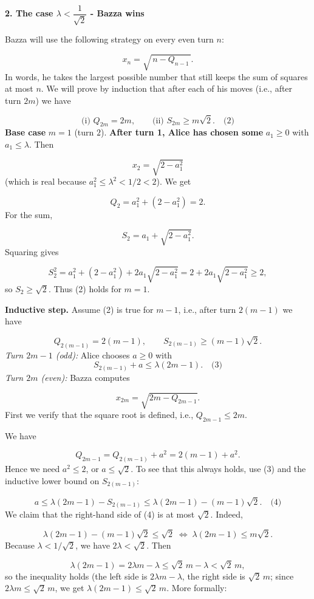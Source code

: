 \documentclass{llmxive}
\providecommand{\solutionheading}[1]{\par\smallskip\noindent\textbf{#1}\par}
\begin{document}
\solutionheading{2. The case \(\lambda < \dfrac{1}{\sqrt{2}}\) - Bazza wins}
Bazza will use the following strategy on every even turn \(n\):\par
\[
x_n = \sqrt{\,n - Q_{n-1}\,}.
\]
In words, he takes the largest possible number that still keeps the sum of squares at most \(n\). We will prove by induction that after each of his moves (i.e., after turn \(2m\)) we have\par
\[
\text{(i) } Q_{2m}=2m, \qquad \text{(ii) } S_{2m} \ge m\sqrt{2}. \quad\text{(2)}
\]
\textbf{Base case }\(m=1\) (turn \(2\)).\textbf{ After turn 1, Alice has chosen some }\(a_1\ge 0\) with \(a_1\le \lambda\). Then\par
\[
x_2 = \sqrt{2 - a_1^2}
\]
(which is real because \(a_1^2 \le \lambda^2 < 1/2 < 2\)). We get\par
\[
Q_2 = a_1^2 + (2 - a_1^2) = 2.
\]
For the sum,\par
\[
S_2 = a_1 + \sqrt{2 - a_1^2}.
\]
Squaring gives\par
\[
S_2^2 = a_1^2 + (2 - a_1^2) + 2a_1\sqrt{2 - a_1^2} = 2 + 2a_1\sqrt{2 - a_1^2} \ge 2,
\]
so \(S_2 \ge \sqrt{2}\). Thus (2) holds for \(m=1\).\par
\textbf{Inductive step.} Assume (2) is true for \(m-1\), i.e., after turn \(2(m-1)\) we have\par
\[
Q_{2(m-1)} = 2(m-1), \qquad S_{2(m-1)} \ge (m-1)\sqrt{2}.
\]
\emph{Turn \(2m-1\) (odd):} Alice chooses \(a \ge 0\) with
\[
S_{2(m-1)} + a \le \lambda(2m-1). \quad\text{(3)}
\]
\emph{Turn \(2m\) (even):} Bazza computes\par
\[
x_{2m} = \sqrt{2m - Q_{2m-1}}.
\]
First we verify that the square root is defined, i.e., \(Q_{2m-1} \le 2m\).\par
We have\par
\[
Q_{2m-1} = Q_{2(m-1)} + a^2 = 2(m-1) + a^2.
\]
Hence we need \(a^2 \le 2\), or \(a \le \sqrt{2}\). To see that this always holds, use (3) and the inductive lower bound on \(S_{2(m-1)}\):\par
\[
a \le \lambda(2m-1) - S_{2(m-1)} \le \lambda(2m-1) - (m-1)\sqrt{2}. \quad\text{(4)}
\]
We claim that the right-hand side of (4) is at most \(\sqrt{2}\). Indeed,\par
\[
\lambda(2m-1) - (m-1)\sqrt{2} \le \sqrt{2}
\;\Longleftrightarrow\; \lambda(2m-1) \le m\sqrt{2}.
\]
Because \(\lambda < 1/\sqrt{2}\), we have \(2\lambda < \sqrt{2}\). Then\par
\[
\lambda(2m-1) = 2\lambda m - \lambda \le \sqrt{2}\,m - \lambda < \sqrt{2}\,m,
\]
so the inequality holds (the left side is \(2\lambda m - \lambda\), the right side is \(\sqrt{2}\,m\); since \(2\lambda m \le \sqrt{2}\,m\), we get \(\lambda(2m-1) \le \sqrt{2}\,m\). More formally:
\end{document}

